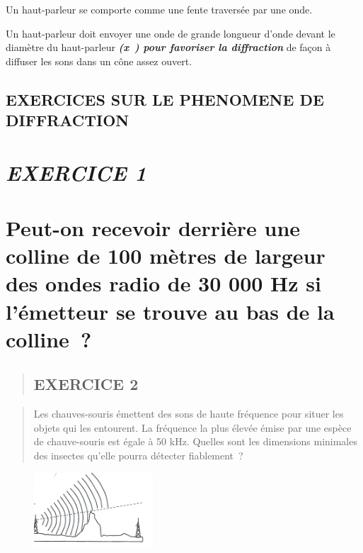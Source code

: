 {{{{Un haut-parleur se comporte comme une fente traversée par une onde.

Un haut-parleur doit envoyer une onde de grande longueur d'onde devant
le diamètre du haut-parleur \emph{\textbf{(x}\textbf{}\textbf{) pour
favoriser la diffraction}} de façon à diffuser les sons dans un cône
assez ouvert.
\subsection{EXERCICES SUR LE PHENOMENE DE DIFFRACTION}

\hypertarget{exercice-1}{%
\section{\texorpdfstring{\emph{EXERCICE
1}}{EXERCICE 1}}\label{exercice-1}

\hypertarget{peut-on-recevoir-derriuxe8re-une-colline-de-100-muxe8tres-de-largeur-des-ondes-radio-de-30-000-hz-si-luxe9metteur-se-trouve-au-bas-de-la-colline}{%
\section{\texorpdfstring{Peut-on recevoir derrière une colline de 100
mètres de largeur des ondes radio de 30 000 Hz si l'émetteur se trouve
au bas de la colline~?
}{Peut-on recevoir derrière une colline de 100 mètres de largeur des ondes radio de 30 000 Hz si l'émetteur se trouve au bas de la colline~? }}\label{peut-on-recevoir-derriuxe8re-une-colline-de-100-muxe8tres-de-largeur-des-ondes-radio-de-30-000-hz-si-luxe9metteur-se-trouve-au-bas-de-la-colline}

\begin{quote}\subsection{EXERCICE 2}
\end{quote}

\begin{quote}
Les chauves-souris émettent des sons de haute fréquence pour situer les
objets qui les entourent. La fréquence la plus élevée émise par une
espèce de chauve-souris est égale à 50 kHz. Quelles sont les dimensions
minimales des insectes qu'elle pourra détecter fiablement~?
\end{quote}

\begin{figure}
\centering
\includegraphics[width=4.445cm,height=2.787cm]{Pictures/10000001000002E4000001CE9CDB74834F100431.png}
\caption{}
\end{figure}
}}}}}}
